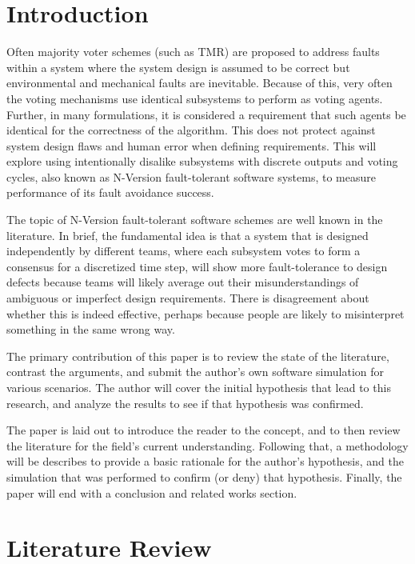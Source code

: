 \documentclass[article]{IEEEtran}
\begin{document}
\section{Introduction}
\par
Often majority voter schemes (such as TMR) are proposed to address faults within a system where the system design is assumed to be correct but environmental and mechanical faults are inevitable. Because of this, very often the voting mechanisms use identical subsystems to perform as voting agents. Further, in many formulations, it is considered a requirement that such agents be identical for the correctness of the algorithm. This does not protect against system design flaws and human error when defining requirements. This will explore using intentionally disalike subsystems with discrete outputs and voting cycles, also known as N-Version fault-tolerant software systems, to measure performance of its fault avoidance success. 
\par
The topic of N-Version fault-tolerant software schemes are well known in the literature. In brief, the fundamental idea is that a system that is designed independently by different teams, where each subsystem votes to form a consensus for a discretized time step, will show more fault-tolerance to design defects because teams will likely average out their misunderstandings of ambiguous or imperfect design requirements. There is disagreement about whether this is indeed effective, perhaps because people are likely to misinterpret something in the same wrong way. 
\par
The primary contribution of this paper is to review the state of the literature, contrast the arguments, and submit the author's own software simulation for various scenarios. The author will cover the initial hypothesis that lead to this research, and analyze the results to see if that hypothesis was confirmed.
\par
The paper is laid out to introduce the reader to the concept, and to then review the literature for the field's current understanding. Following that, a methodology will be describes to provide a basic rationale for the author's hypothesis, and the simulation that was performed to confirm (or deny) that hypothesis. Finally, the paper will end with a conclusion and related works section.


\section{Literature Review}
\end{document}
